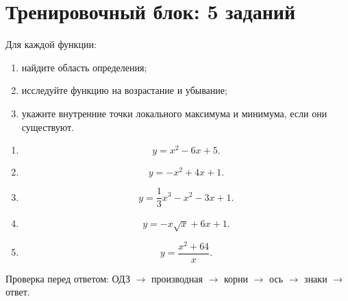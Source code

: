 \documentclass[a4paper,12pt]{article}
\begin{document}
\clearpage


\section*{Тренировочный блок: 5 заданий}

Для каждой функции:

\begin{enumerate}[label=\textbf{\arabic*.}]

  \item
  найдите область определения;

  \item
  исследуйте функцию на возрастание и убывание;

  \item
  укажите внутренние точки локального максимума и минимума, если они существуют.

\end{enumerate}

\vspace{3mm}

\begin{enumerate}[
  label=\textbf{Задание \arabic*.},
  leftmargin=5mm,
  labelindent=5mm,
  itemindent=5mm
]

  \item
  \[
  y=x^2-6x+5.
  \]

  \item
  \[
  y=-x^2+4x+1.
  \]

  \item
  \[
  y=
  \frac13x^3
  -
  x^2
  -
  3x
  +
  1.
  \]

  \item
  \[
  y=-x\sqrt{x}+6x+1.
  \]

  \item
  \[
  y=\frac{x^2+64}{x}.
  \]

\end{enumerate}

\vfill

\textcolor{softgray}{
\small
Проверка перед ответом:
ОДЗ
\(\rightarrow\)
производная
\(\rightarrow\)
корни
\(\rightarrow\)
ось
\(\rightarrow\)
знаки
\(\rightarrow\)
ответ.
}

\clearpage

\end{document}
